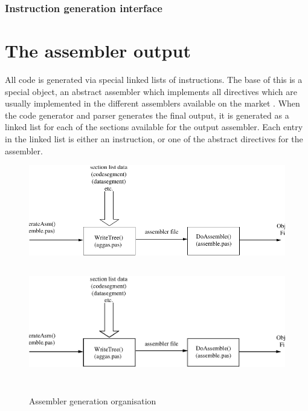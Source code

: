 \documentclass [a4paper,12pt]{article}
\begin{document}
\subsubsection{Instruction generation interface}
\label{subsubsec:instruction}

\section{The assembler output}
\label{sec:mylabel8}

All code is generated via special linked lists of instructions. The base of
this is a special object, an abstract assembler which implements all
directives which are usually implemented in the different assemblers
available on the market . When the code generator and parser generates the
final output, it is generated as a linked list for each of the sections
available for the output assembler. Each entry in the linked list is either
an instruction, or one of the abstract directives for the assembler.

\begin{figure}
\ifpdf
\includegraphics{arch11.pdf}
\else
\includegraphics[width=5.67in,height=2.17in]{arch11.eps}
\fi
\label{fig:fig11}
\caption{Assembler generation organisation}
\end{figure}

\clearpage
\end{document}
